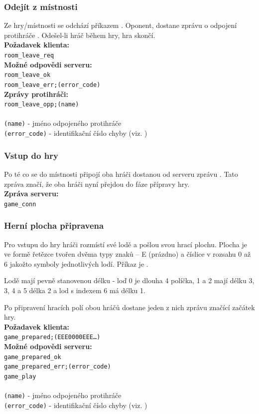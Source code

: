 \documentclass[12pt, a4paper]{article} %
\begin{document}
	\subsubsection{Odejít z místnosti}
	\par Ze hry/místnosti se odchází příkazem . Oponent, dostane zprávu o odpojení protihráče . Odešel-li hráč během hry, hra skončí.\\
	\textbf{Požadavek klienta:}\\
	\texttt{room\_leave\_req}\\
	\textbf{Možné odpovědi serveru:}\\
	\texttt{room\_leave\_ok}\\
	\texttt{room\_leave\_err;(error\_code)}\\
	\textbf{Zprávy protihráči:}\\
	\texttt{room\_leave\_opp;(name)}\\\\
	\texttt{(name)} - jméno odpojeného protihráče\\
	\texttt{(error\_code)} - identifikační číslo chyby (viz. )
	\subsubsection{Vstup do hry}
	\par Po té co se do místnosti připojí oba hráči dostanou od serveru zprávu . Tato zpráva značí, že oba hráči nyní přejdou do fáze přípravy hry.\\
	\textbf{Zpráva serveru:}\\
	\texttt{game\_conn}
	\subsubsection{Herní plocha připravena}
	\label{ssec:game_ready}
	\par Pro vstupu do hry hráči rozmístí své lodě a pošlou svou hrací plochu. Plocha je ve formě řetězce tvořen dvěma typy znaků – E (prázdno) a číslice v rozsahu 0 až 6 jakožto symboly jednotlivých lodí. Příkaz je .
	\par Lodě mají pevně stanovenou délku - loď 0 je dlouha 4 políčka, 1 a 2 mají délku 3, 3, 4 a 5 délka 2 a lod s indexem 6 má délku 1.
	\par Po připravení hracích polí obou hráčů dostane jeden z nich zprávu  značící začátek hry.\\
	\textbf{Požadavek klienta:}\\
	\texttt{game\_prepared;(EEE0000EEE…)}\\
	\textbf{Možné odpovědi serveru:}\\
	\texttt{game\_prepared\_ok}\\
	\texttt{game\_prepared\_err;(error\_code)}\\
	\texttt{game\_play}\\\\
	\texttt{(name)} - jméno odpojeného protihráče\\
	\texttt{(error\_code)} - identifikační číslo chyby (viz. )
		
\end{document}

